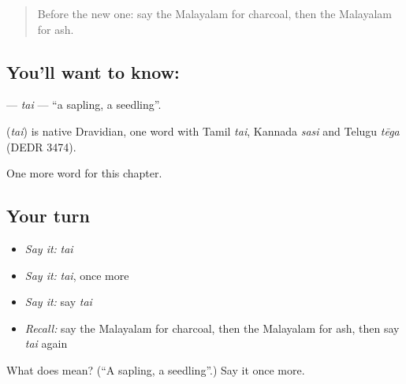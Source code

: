 \begin{quote}
Before the new one: say the Malayalam for charcoal, then the Malayalam for ash.
\end{quote}

\subsection*{You'll want to know: }
\textbf{} — \emph{tai} — \textquotedblleft{}a sapling, a seedling\textquotedblright{}.

\begin{cousinweb}
\textbf{} (\emph{tai}) is native Dravidian, one word with Tamil \emph{tai}, Kannada \emph{sasi} and Telugu \emph{tēga} (DEDR 3474).
\end{cousinweb}

\begin{grammarlens}[title={What you've built}]
One more word for this chapter.
\end{grammarlens}

\subsection*{Your turn}
\begin{itemize}
\raggedright
  \item \emph{Say it:} \emph{tai}
  \item \emph{Say it:} \emph{tai}, once more
  \item \emph{Say it:} say \emph{tai}
  \item \emph{Recall:} say the Malayalam for charcoal, then the Malayalam for ash, then say \emph{tai} again
\end{itemize}

\begin{tcolorbox}[breakable,colback=teal!4,colframe=teal!35!black,title={Before you move on}]
What does  mean? (\textquotedblleft{}A sapling, a seedling\textquotedblright{}.) Say it once more.
\end{tcolorbox}
